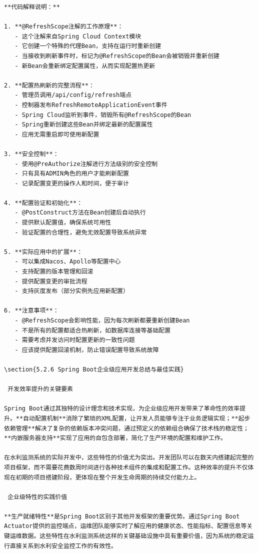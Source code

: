 \begin{lstlisting}
**代码解释说明：**

1. **@RefreshScope注解的工作原理**：
   - 这个注解来自Spring Cloud Context模块
   - 它创建一个特殊的代理Bean，支持在运行时重新创建
   - 当接收到刷新事件时，标记为@RefreshScope的Bean会被销毁并重新创建
   - 新Bean会重新绑定配置属性，从而实现配置热更新

2. **配置热刷新的完整流程**：
   - 管理员调用/api/config/refresh端点
   - 控制器发布RefreshRemoteApplicationEvent事件
   - Spring Cloud监听到事件，销毁所有@RefreshScope的Bean
   - Spring重新创建这些Bean并绑定最新的配置属性
   - 应用无需重启即可使用新配置

3. **安全控制**：
   - 使用@PreAuthorize注解进行方法级别的安全控制
   - 只有具有ADMIN角色的用户才能刷新配置
   - 记录配置变更的操作人和时间，便于审计

4. **配置验证和初始化**：
   - @PostConstruct方法在Bean创建后自动执行
   - 提供默认配置值，确保系统可用性
   - 验证配置的合理性，避免无效配置导致系统异常

5. **实际应用中的扩展**：
   - 可以集成Nacos、Apollo等配置中心
   - 支持配置的版本管理和回滚
   - 提供配置变更的审批流程
   - 支持灰度发布（部分实例先应用新配置）

6. **注意事项**：
   - @RefreshScope会影响性能，因为每次刷新都要重新创建Bean
   - 不是所有的配置都适合热刷新，如数据库连接等基础配置
   - 需要考虑并发访问时配置更新的一致性问题
   - 应该提供配置回滚机制，防止错误配置导致系统故障

\section{5.2.6 Spring Boot企业级应用开发总结与最佳实践}

 开发效率提升的关键要素

Spring Boot通过其独特的设计理念和技术实现，为企业级应用开发带来了革命性的效率提升。**自动配置机制**消除了繁琐的XML配置，让开发人员能够专注于业务逻辑实现；**起步依赖管理**解决了复杂的依赖版本冲突问题，通过预定义的依赖组合确保了技术栈的稳定性；**内嵌服务器支持**实现了应用的自包含部署，简化了生产环境的配置和维护工作。

在水利监测系统的实际开发中，这些特性的价值尤为突出。开发团队可以在数天内搭建起完整的项目框架，而不需要花费数周时间进行各种技术组件的集成和配置工作。这种效率的提升不仅体现在初期的项目搭建阶段，更体现在整个开发生命周期的持续交付能力上。

 企业级特性的实践价值

**生产就绪特性**是Spring Boot区别于其他开发框架的重要优势。通过Spring Boot Actuator提供的监控端点，运维团队能够实时了解应用的健康状态、性能指标、配置信息等关键运维数据。这些特性在水利监测系统这样的关键基础设施中具有重要价值，因为系统的稳定运行直接关系到水利安全监控工作的有效性。


\end{lstlisting}
